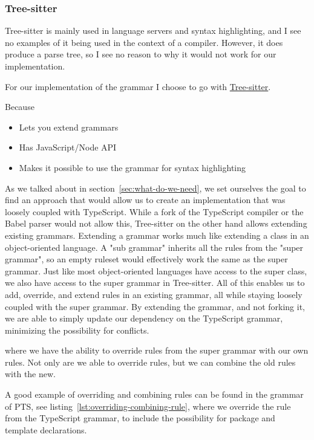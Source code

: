 \subsubsection{Tree-sitter}\label{subsubsec:tree-sitter}

Tree-sitter is mainly used in language servers and syntax highlighting, and I see no examples of it being used in the context of a compiler.
However, it does produce a parse tree, so I see no reason to why it would not work for our implementation.

For our implementation of the grammar I choose to go with \href{https://tree-sitter.github.io/tree-sitter/}{Tree-sitter}.

Because
\begin{itemize}
    \item Lets you extend grammars
    \item Has JavaScript/Node API
    \item Makes it possible to use the grammar for syntax highlighting
\end{itemize}


As we talked about in section~\vref{sec:what-do-we-need}, we set ourselves the goal to find an approach that would allow us to create an implementation that was loosely coupled with TypeScript.
While a fork of the TypeScript compiler or the Babel parser would not allow this, Tree-sitter on the other hand allows extending existing grammars.
Extending a grammar works much like extending a class in an object-oriented language.
A "sub grammar" inherits all the rules from the "super grammar", so an empty ruleset would effectively work the same as the super grammar.
Just like most object-oriented languages have access to the super class, we also have access to the super grammar in Tree-sitter.
All of this enables us to add, override, and extend rules in an existing grammar, all while staying loosely coupled with the super grammar.
By extending the grammar, and not forking it, we are able to simply update our dependency on the TypeScript grammar, minimizing the possibility for conflicts.

where we have the ability to override rules from the super grammar with our own rules.
Not only are we able to override rules, but we can combine the old rules with the new.

A good example of overriding and combining rules can be found in the grammar of PTS, see listing~\vref{lst:overriding-combining-rule}, where we override the  rule from the TypeScript grammar, to include the possibility for package and template declarations.

